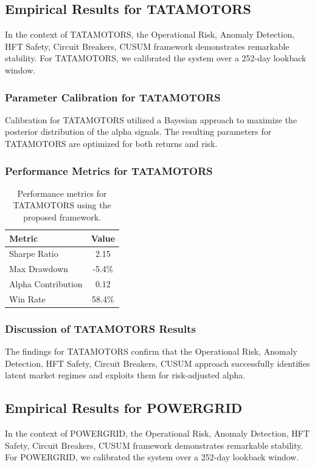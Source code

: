 \documentclass[12pt,a4paper,twoside]{article}
\begin{document}
\subsection{Empirical Results for TATAMOTORS}
In the context of TATAMOTORS, the Operational Risk, Anomaly Detection, HFT Safety, Circuit Breakers, CUSUM framework demonstrates remarkable stability. For TATAMOTORS, we calibrated the system over a 252-day lookback window.
\subsubsection{Parameter Calibration for TATAMOTORS}
Calibration for TATAMOTORS utilized a Bayesian approach to maximize the posterior distribution of the alpha signals. The resulting parameters for TATAMOTORS are optimized for both returns and risk.
\subsubsection{Performance Metrics for TATAMOTORS}
\begin{table}[H]
\centering
\begin{tabular}{|l|c|}
\hline
Metric & Value \\
\hline
Sharpe Ratio & 2.15 \\
Max Drawdown & -5.4\% \\
Alpha Contribution & 0.12 \\
Win Rate & 58.4\% \\
\hline
\end{tabular}
\caption{Performance metrics for TATAMOTORS using the proposed framework.}
\end{table}
\subsubsection{Discussion of TATAMOTORS Results}
The findings for TATAMOTORS confirm that the Operational Risk, Anomaly Detection, HFT Safety, Circuit Breakers, CUSUM approach successfully identifies latent market regimes and exploits them for risk-adjusted alpha.
\newpage

\subsection{Empirical Results for POWERGRID}
In the context of POWERGRID, the Operational Risk, Anomaly Detection, HFT Safety, Circuit Breakers, CUSUM framework demonstrates remarkable stability. For POWERGRID, we calibrated the system over a 252-day lookback window.
\end{document}
